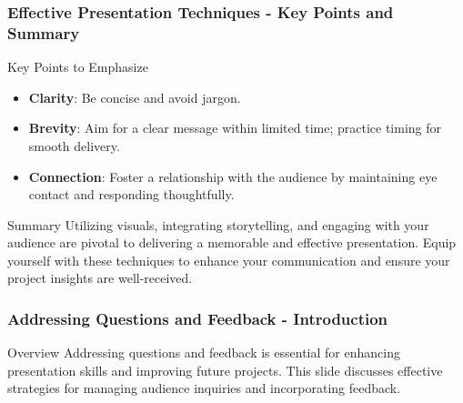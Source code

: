 \documentclass[aspectratio=169]{beamer}
\begin{document}
\begin{frame}[fragile]
    \frametitle{Effective Presentation Techniques - Key Points and Summary}
    \begin{block}{Key Points to Emphasize}
        \begin{itemize}
            \item \textbf{Clarity}: Be concise and avoid jargon.
            \item \textbf{Brevity}: Aim for a clear message within limited time; practice timing for smooth delivery.
            \item \textbf{Connection}: Foster a relationship with the audience by maintaining eye contact and responding thoughtfully.
        \end{itemize}
    \end{block}

    \begin{block}{Summary}
        Utilizing visuals, integrating storytelling, and engaging with your audience are pivotal to delivering a memorable and effective presentation. Equip yourself with these techniques to enhance your communication and ensure your project insights are well-received.
    \end{block}
\end{frame}

\begin{frame}[fragile]
    \frametitle{Addressing Questions and Feedback - Introduction}
    \begin{block}{Overview}
        Addressing questions and feedback is essential for enhancing presentation skills and improving future projects. This slide discusses effective strategies for managing audience inquiries and incorporating feedback.
    \end{block}
\end{frame}
\end{document}

